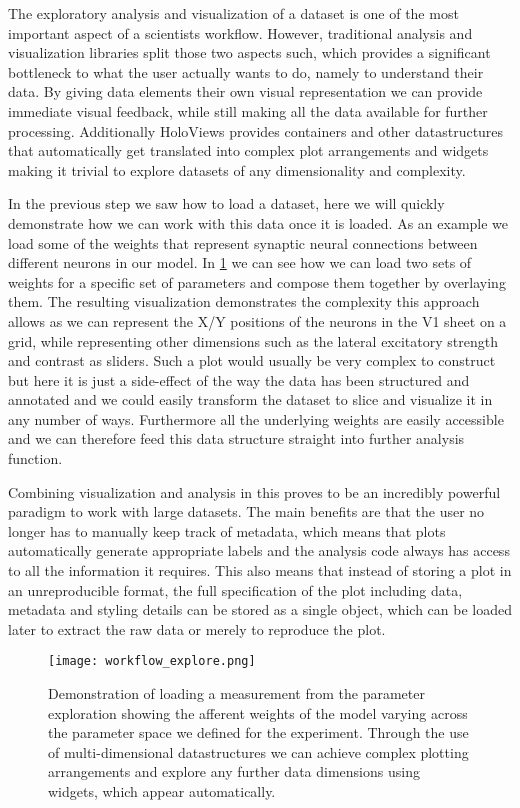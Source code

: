 The exploratory analysis and visualization of a dataset is one of the
most important aspect of a scientists workflow. However, traditional
analysis and visualization libraries split those two aspects such,
which provides a significant bottleneck to what the user actually
wants to do, namely to understand their data. By giving data elements
their own visual representation we can provide immediate visual
feedback, while still making all the data available for further
processing. Additionally HoloViews provides containers and other
datastructures that automatically get translated into complex plot
arrangements and widgets making it trivial to explore datasets of any
dimensionality and complexity.

In the previous step we saw how to load a dataset, here we will
quickly demonstrate how we can work with this data once it is loaded.
As an example we load some of the weights that represent synaptic
neural connections between different neurons in our model. In
\ref{workflow_explore} we can see how we can load two sets of weights
for a specific set of parameters and compose them together by
overlaying them. The resulting visualization demonstrates the
complexity this approach allows as we can represent the X/Y positions
of the neurons in the V1 sheet on a grid, while representing other
dimensions such as the lateral excitatory strength and contrast as
sliders. Such a plot would usually be very complex to construct but
here it is just a side-effect of the way the data has been structured
and annotated and we could easily transform the dataset to slice and
visualize it in any number of ways. Furthermore all the underlying
weights are easily accessible and we can therefore feed this data
structure straight into further analysis function.

Combining visualization and analysis in this proves to be an
incredibly powerful paradigm to work with large datasets. The main
benefits are that the user no longer has to manually keep track of
metadata, which means that plots automatically generate appropriate
labels and the analysis code always has access to all the information
it requires. This also means that instead of storing a plot in an
unreproducible format, the full specification of the plot including
data, metadata and styling details can be stored as a single object,
which can be loaded later to extract the raw data or merely to
reproduce the plot.

\begin{figure}
	\centering
        \texttt{[image: workflow\_explore.png]}
	\caption[Demonstration of complex parameter exploration in
      HoloViews.]{Demonstration of loading a measurement from the
      parameter exploration showing the afferent weights of the model
      varying across the parameter space we defined for the
      experiment. Through the use of multi-dimensional datastructures
      we can achieve complex plotting arrangements and explore any
      further data dimensions using widgets, which appear
      automatically.}
	\label{workflow_explore}
\end{figure}


